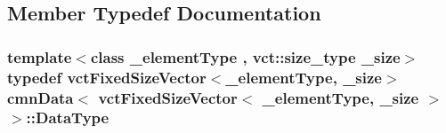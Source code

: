 \subsection{Member Typedef Documentation}
\hypertarget{classcmn_data_3_01vct_fixed_size_vector_3_01__element_type_00_01__size_01_4_01_4_ac8ff1c45828cc2add8111e02980f183a}{}
\subsubsection[{Data\+Type}]{\setlength{\rightskip}{0pt plus 5cm}template$<$class \+\_\+element\+Type , vct\+::size\+\_\+type \+\_\+size$>$ typedef {\bf vct\+Fixed\+Size\+Vector}$<$\+\_\+element\+Type, \+\_\+size$>$ {\bf cmn\+Data}$<$ {\bf vct\+Fixed\+Size\+Vector}$<$ \+\_\+element\+Type, \+\_\+size $>$ $>$\+::{\bf Data\+Type}}\label{classcmn_data_3_01vct_fixed_size_vector_3_01__element_type_00_01__size_01_4_01_4_ac8ff1c45828cc2add8111e02980f183a}


